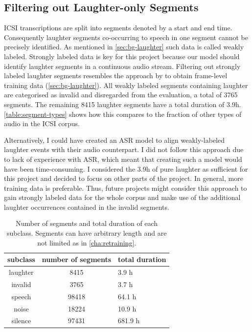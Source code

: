 \documentclass[bsc,frontabs,parskip,deptreport]{infthesis}
\begin{document}
\subsection{Filtering out Laughter-only Segments} \label{subsec:filter-laughter}
ICSI transcriptions are split into segments denoted by a start and end time.
Consequently laughter segments co-occurring to speech in one segment cannot be precisely identified.
As mentioned in \autoref{sec:bg-laughter} such data is called weakly labeled.
Strongly labeled data is key for this project because our model should identify laughter segments in a continuous audio stream.
Filtering out strongly labeled laughter segments resembles the approach by \citet{knox2006automatic} to obtain frame-level training data (\autoref{sec:bg-laughter}). 
All weakly labeled segments containing laughter are categorised as invalid and disregarded from the evaluation, a total of 3765 segments.
The remaining 8415 laughter segments have a total duration of 3.9h. \autoref{table:segment-types} shows how this compares to the fraction of other types of audio in the ICSI corpus.

Alternatively, I could have created an ASR model to align weakly-labeled laughter events with their audio counterpart. 
I did not follow this approach due to lack of experience with ASR, which meant that creating such a model would have been time-consuming. I considered the 3.9h of pure laughter as sufficient for this project and decided to focus on other parts of the project.
In general, more training data is preferable. Thus, future projects might consider this approach to gain strongly labeled data for the whole corpus and make use of the additional laughter occurrences contained in the invalid segments. 

\begin{table}[h!]
\begin{tabular}{c|c|l}
     subclass & number of segments & total duration \\
     \hline
     laughter & 8415 & 3.9 h \\ 
     invalid & 3765 & 3.7 h \\
     speech & 98418 & 64.1 h \\
     noise & 18224 & 10.9 h \\
     silence & 97431 & 681.9 h 
\end{tabular}
\centering
\caption{Number of segments and total duration of each subclass. Segments can have arbitrary length and are not limited as in \autoref{cha:retraining}.}
\label{table:segment-types}
\end{table}
\end{document}
